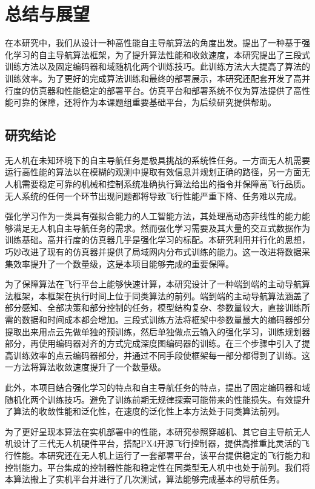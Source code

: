 
\chapter{总结与展望}
\label{final}

在本研究中，我们从设计一种高性能自主导航算法的角度出发。提出了一种基于强化学习的自主导航算法框架，为了提升算法性能和收敛速度，本研究提出了三段式训练方法以及固定编码器和域随机化两个训炼技巧。此训练方法大大提高了算法的训练效率。为了更好的完成算法训练和最终的部署展示，本研究还配套开发了高并行度的仿真器和性能稳定的部署平台。仿真平台和部署系统不仅为算法提供了高性能可靠的保障，还将作为本课题组重要基础平台，为后续研究提供帮助。

\section{研究结论}

无人机在未知环境下的自主导航任务是极具挑战的系统性任务。一方面无人机需要运行高性能的算法以在模糊的观测中提取有效信息并规划正确的路径，另一方面无人机需要稳定可靠的机械和控制系统准确执行算法给出的指令并保障高飞行品质。无人系统的任何一个环节出现问题都将导致飞行性能严重下降、任务难以完成。

强化学习作为一类具有强拟合能力的人工智能方法，其处理高动态非线性的能力能够满足无人机自主导航任务的需求。然而强化学习需要及其大量的交互式数据作为训练基础。高并行度的仿真器几乎是强化学习的标配。本研究利用并行化的思想，巧妙改进了现有的仿真器并提供了局域网内分布式训练的能力。这一改进将数据采集效率提升了一个数量级，这是本项目能够完成的重要保障。

为了保障算法在飞行平台上能够快速计算，本研究设计了一种端到端的主动导航算法框架，本框架在执行时间上位于同类算法的前列。端到端的主动导航算法涵盖了部分感知、全部决策和部分控制的任务，模型结构复杂、参数量较大，直接训练所需的数据和时间成本都会增加。三段式训练方法将框架中参数量最大的编码器部分提取出来用点云先做单独的预训练，然后单独做点云输入的强化学习，训练规划器部分，再使用编码器对齐的方式完成深度图编码器的训练。在三个步骤中引入了提高训练效率的点云编码器部分，并通过不同手段使框架每一部分都得到了训练。这一方法将算法收敛速度提升了一个数量级。

此外，本项目结合强化学习的特点和自主导航任务的特点，提出了固定编码器和域随机化两个训练技巧。避免了训练前期无规律探索可能带来的性能损失。有效提升了算法的收敛性能和泛化性，在速度的泛化性上本方法处于同类算法前列。

为了更好呈现本算法在实机部署中的性能，本研究参照穿越机、其它自主导航无人机设计了三代无人机硬件平台，搭配PX4开源飞行控制器，提供高推重比灵活的飞行性能。本研究还在无人机上运行了一套部署平台，该平台提供稳定的飞行能力和控制能力。平台集成的控制器性能和稳定性在同类型无人机中也处于前列。我们将本算法搬上了实机平台并进行了几次测试，算法能够完成基本的导航任务。

